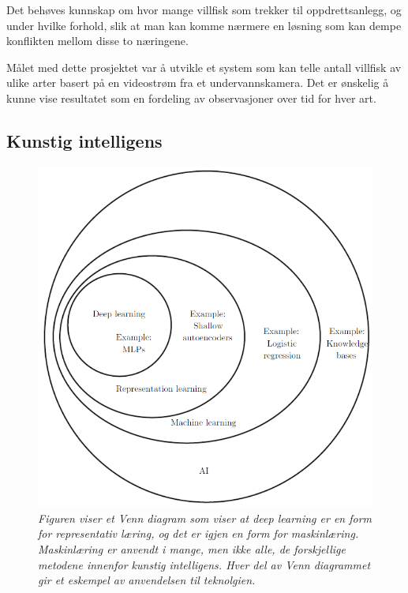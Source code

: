 Det behøves kunnskap om hvor mange villfisk som trekker til oppdrettsanlegg, og under hvilke forhold, slik at man kan komme nærmere en løsning som kan dempe konflikten mellom disse to næringene. 

Målet med dette prosjektet var å utvikle et system som kan telle antall villfisk av ulike arter basert på en videostrøm fra et undervannskamera. Det er ønskelig å kunne vise resultatet som en fordeling av observasjoner over tid for hver art. 

\subsection{Kunstig intelligens}

\begin{figure} 
\begin{center} 
\includegraphics[scale=0.7]{figures/ai}
\caption{\small \sl Figuren viser et Venn diagram som viser at deep learning er en form for representativ læring, og det er igjen en form for maskinlæring. Maskinlæring er anvendt i mange, men ikke alle, de forskjellige metodene innenfor kunstig intelligens. Hver del av Venn diagrammet gir et eskempel av anvendelsen til teknolgien. \cite{Goodfellow m.fl. 2016 s. 9} \label{fig:ai}} 
\end{center} 
\end{figure} 

